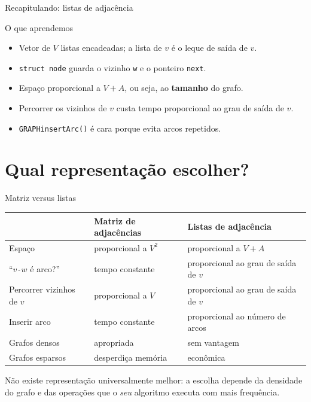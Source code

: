 \documentclass[aspectratio=169]{beamer}
\begin{document}
\begin{frame}[fragile]{Recapitulando: listas de adjacência}
  \begin{block}{O que aprendemos}
    \begin{itemize}\small
      \item Vetor de $V$ listas encadeadas; a lista de $v$ é o leque de saída de $v$.
      \item \lstinline|struct node| guarda o vizinho \texttt{w} e o ponteiro \texttt{next}.
      \item Espaço proporcional a $V+A$, ou seja, ao \textbf{tamanho} do grafo.
      \item Percorrer os vizinhos de $v$ custa tempo proporcional ao grau de saída de $v$.
      \item \texttt{GRAPHinsertArc()} é cara porque evita arcos repetidos.
    \end{itemize}
  \end{block}
\end{frame}

\section{Qual representação escolher?}

\begin{frame}{Matriz {\small versus} listas}
  \begin{center}
  {\small
  \begin{tabular}{lll}
    \toprule
    & \textbf{Matriz de adjacências} & \textbf{Listas de adjacência} \\
    \midrule
    Espaço                        & proporcional a $V^2$ & proporcional a $V+A$ \\
    ``$v$\texttt{-}$w$ é arco?''  & tempo constante      & proporcional ao grau de saída de $v$ \\
    Percorrer vizinhos de $v$     & proporcional a $V$   & proporcional ao grau de saída de $v$ \\
    Inserir arco                  & tempo constante      & proporcional ao número de arcos \\
    Grafos densos                 & apropriada           & sem vantagem \\
    Grafos esparsos               & desperdiça memória   & econômica \\
    \bottomrule
  \end{tabular}}
  \end{center}
  \medskip
  {\small Não existe representação universalmente melhor: a escolha depende da
  densidade do grafo e das operações que o \emph{seu} algoritmo executa com mais
  frequência.}
\end{frame}
\end{document}

